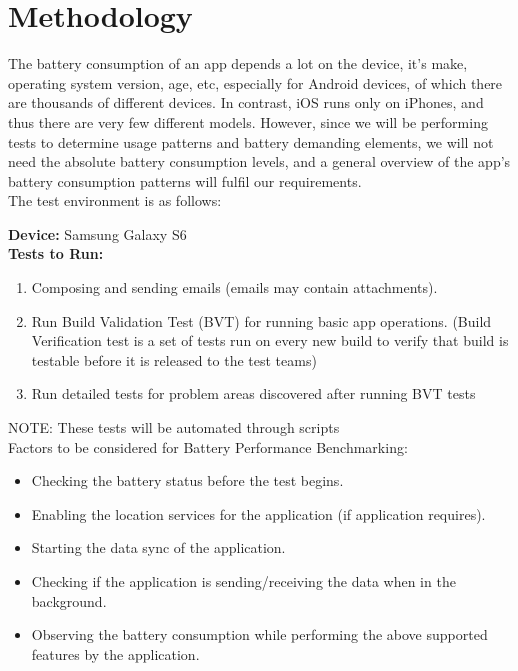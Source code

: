 \setlength\parindent{0pt}

\chapter{Methodology}

The battery consumption of an app depends a lot on the device, it’s make, operating system version, age, etc, especially for Android devices, of which there are thousands of different devices. In contrast, iOS runs only on iPhones, and thus there are very few different models. However, since we will be performing tests to determine usage patterns and battery demanding elements, we will not need the absolute battery consumption levels, and a general overview of the app’s battery consumption patterns will fulfil our requirements.\\

The test environment is as follows:

\textbf{Device:} Samsung Galaxy S6\\

\textbf {Tests to Run:}
\begin{enumerate}
	\item Composing and sending emails (emails may contain attachments).
	\item Run Build Validation Test (BVT) for running basic app operations. (Build Verification test is a set of tests run on every new build to verify that build is testable before it is released to the test teams)
	\item Run detailed tests for problem areas discovered after running BVT tests 
\end{enumerate}
NOTE: These tests will be automated through scripts \\

Factors to be considered for Battery Performance Benchmarking:
\begin{itemize}
	\item Checking the battery status before the test begins.
	\item Enabling the location services for the application (if application requires).
	\item Starting the data sync of the application.
	\item Checking if the application is sending/receiving the data when in the background.
	\item Observing the battery consumption while performing the above supported features by the application.
\end{itemize}

